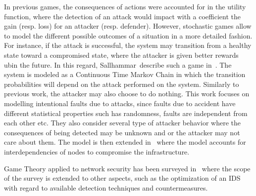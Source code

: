 In previous games, the consequences of actions were accounted for in the utility function, where the detection of an attack would impact with a coefficient the gain (resp. loss) for an attacker (resp. defender).
However, stochastic games allow to model the different possible outcomes of a situation in a more detailed fashion.
For instance, if the attack is successful, the system may transition from a healthy state toward a compromised state, where the attacker is given better rewards ubin the future.
In this regard, Sallhammar~\etal describe such a game in~\cite{sallhammar2005}.
The system is modeled as a Continuous Time Markov Chain in which the transition probabilities will depend on the attack performed on the system. Similarly to previous work, the attacker may also choose to do nothing.
This work focuses on modelling intentional faults due to attacks, since faults due to accident have different statistical properties such has randomness, faults are independent from each other etc.
They also consider several type of attacker behavior where the consequences of being detected may be unknown and or the attacker may not care about them.
The model is then extended in~\cite{Nguyen2009} where the model accounts for interdependencies of nodes to compromise the infrastructure.

Game Theory applied to network security has been surveyed in~\cite{Roy2010,Kiennert2018} where the scope of the survey is extended to other aspects, such as the optimization of an IDS with regard to available detection techniques and countermeasures.
 
